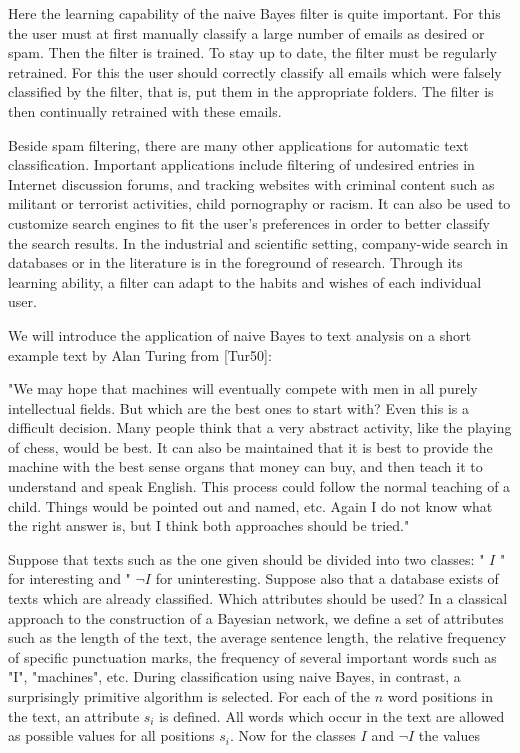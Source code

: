 \documentclass[10pt]{article}
\begin{document}
Here the learning capability of the naive Bayes filter is quite important. For this the user must at first manually classify a large number of emails as desired or spam. Then the filter is trained. To stay up to date, the filter must be regularly retrained. For this the user should correctly classify all emails which were falsely classified by the filter, that is, put them in the appropriate folders. The filter is then continually retrained with these emails.


Beside spam filtering, there are many other applications for automatic text classification. Important applications include filtering of undesired entries in Internet discussion forums, and tracking websites with criminal content such as militant or terrorist activities, child pornography or racism. It can also be used to customize search engines to fit the user's preferences in order to better classify the search results. In the industrial and scientific setting, company-wide search in databases or in the literature is in the foreground of research. Through its learning ability, a filter can adapt to the habits and wishes of each individual user.

We will introduce the application of naive Bayes to text analysis on a short example text by Alan Turing from [Tur50]:

\begin{displayquote}
"We may hope that machines will eventually compete with men in all purely intellectual fields. But which are the best ones to start with? Even this is a difficult decision. Many people think that a very abstract activity, like the playing of chess, would be best. It can also be maintained that it is best to provide the machine with the best sense organs that money can buy, and then teach it to understand and speak English. This process could follow the normal teaching of a child. Things would be pointed out and named, etc. Again I do not know what the right answer is, but I think both approaches should be tried."
\end{displayquote}

Suppose that texts such as the one given should be divided into two classes: " $I$ " for interesting and " $\neg I$ for uninteresting. Suppose also that a database exists of texts which are already classified. Which attributes should be used? In a classical approach to the construction of a Bayesian network, we define a set of attributes such as the length of the text, the average sentence length, the relative frequency of specific punctuation marks, the frequency of several important words such as "I", "machines", etc. During classification using naive Bayes, in contrast, a surprisingly primitive algorithm is selected. For each of the $n$ word positions in the text, an attribute $s_{i}$ is defined. All words which occur in the text are allowed as possible values for all positions $s_{i}$. Now for the classes $I$ and $\neg I$ the values
\end{document}
